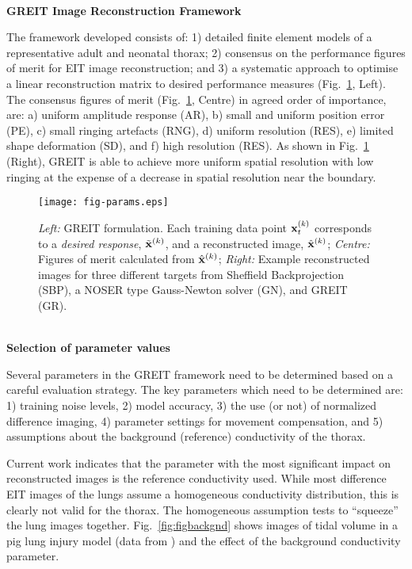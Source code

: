 \documentclass[12pt]{article}
\newcommand{\mysection}[1]{
~\\ \noindent
{\bf \normalsize #1}
\vspace{1mm}
}
\begin{document}
\vspace{-3mm}
\mysection{GREIT Image Reconstruction Framework}

The framework developed\cite{GREIT09} consists of: 1)
detailed finite element models of a representative adult
and neonatal thorax; 2) consensus on the performance
figures of merit for EIT image reconstruction; and 3) a
systematic approach to optimise a linear reconstruction
matrix to desired performance measures (Fig.\ \ref{fig:figparams}, Left).
The consensus figures of merit (Fig.\ \ref{fig:figparams}, Centre)
 in agreed order of importance,
are: a) uniform amplitude response (AR), b) small and
uniform position error (PE), c) small ringing artefacts (RNG),
d) uniform resolution (RES), e) limited shape deformation (SD),
and f) high resolution (RES). 
As shown in Fig.\ \ref{fig:figparams} (Right), GREIT is able to 
achieve more uniform spatial resolution with low ringing at the
expense of a decrease in spatial resolution near the boundary.
\vspace{-4mm}
\begin{figure}[htp]
\centering
\texttt{[image: fig-params.eps]}
\vspace{-6mm}
\caption{%
\small
{\em Left:} GREIT formulation. Each training data point
    ${\bf x}_t^{(k)}$ corresponds to a {\em desired response},
$\tilde{\bf x}^{(k)}$, and a reconstructed image,
  $\hat{\bf x}^{(k)}$;
{\em Centre:} Figures of merit calculated from $\hat{\bf x}^{(k)}$;
{\em Right:} Example reconstructed images for three different
targets from
Sheffield Backprojection (SBP), a NOSER type Gauss-Newton solver (GN),
and GREIT (GR).
}
\label{fig:figparams}
\end{figure}

\vspace{-8mm}
\mysection{Selection of parameter values}

Several parameters in the GREIT framework need to be
determined based on a careful evaluation strategy.
The key parameters which need to
be determined are:
1) training noise levels,
2) model accuracy,
3) the use (or not) of normalized difference imaging,
4) parameter settings for movement compensation, and
5) assumptions about the background (reference)
   conductivity of the thorax.

Current work indicates that the parameter with the most
significant impact on reconstructed images is the
reference conductivity used. While most difference EIT
images of the lungs assume a homogeneous conductivity 
distribution, this is clearly not valid for the thorax. 
The homogeneous assumption tests to ``squeeze'' the lung
images together. Fig.\ \ref{fig:figbackgnd} shows images
of tidal volume in a pig lung injury model (data from 
\cite{frerichs03}) and the effect of the background
conductivity parameter. 
\end{document}
